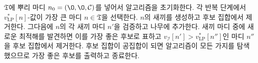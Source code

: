 \documentclass[11pt]{article} %
\newif\ifen
\theoremstyle{definition}
\theoremstyle{definition}
\begin{document}
\ifen
The algorithm is initialized by populating $\mathfrak{T}$ with the root node $n_0 = (\O, \O, \mathcal{C})$. At each iteration, it selects the node $n \in \mathfrak{T}$ having the highest $v_{\mathrm{LP}}^*[n]$-value, generates its children, and removes $n$ from the candidate set. Next, the children $n'$ of $n$ are inspected and added to the tree. If one of the children yields a new optimal solution, then we mark it as the best candidate and fathom any nodes $n''$ for which  $v_{\mathcal{I}}[n'] >  v_{\mathrm{LP}}^*[n'']$. When no nodes remain in the candidate set, the algorithm has explored every branch, so it returns the best candidate and terminates.
\else
$\mathfrak{T}$에 뿌리 마디 $n_0 = (\O, \O, \mathcal{C})$를 넣어서 알고리즘을 초기화한다. 각 반복 단계에서 $v_{\mathrm{LP}}^*[n]$-값이 가장 큰 마디 $n \in \mathfrak{T}$을 선택한다. $n$의 새끼를 생성하고 후보 집합에서 제거한다. 그다음에 $n$의 각 새끼 마디 $n'$을 검증하고 나무에 추가한다. 새끼 마디 중에 새로운 최적해를 발견하면 이를 가장 좋은 후보로 표하고  $v_{\mathcal{I}}[n'] >  v_{\mathrm{LP}}^*[n'']$인 마디 $n''$을 후보 집합에서 제거한다. 후보 집합이 공집합이 되면 알고리즘이 모든 가지를 탐색했으므로 가장 좋은 후보를 출력하고 종료한다.
\fi
\end{document}
